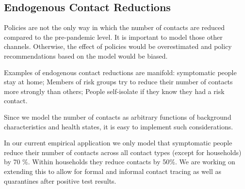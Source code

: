 \subsection{Endogenous Contact Reductions}
\label{sec:endogenous_contact_reductions}

Policies are not the only way in which the number of contacts are reduced compared to the pre-pandemic level. It is important to model those other channels. Otherwise, the effect of policies would be overestimated and policy recommendations based on the model would be biased.

Examples of endogenous contact reductions are manifold: symptomatic people stay at home; Members of risk groups try to reduce their number of contacts more strongly than others; People self-isolate if they know they had a risk contact.

Since we model the number of contacts as arbitrary functions of background characteristics and health states, it is easy to implement such considerations.

In our current empirical application we only model that symptomatic people reduce their number of contacts across all contact types (except for households) by 70 \%. Within households they reduce contacts by 50\%. We are working on extending this to allow for formal and informal contact tracing as well as quarantines after positive test results.
